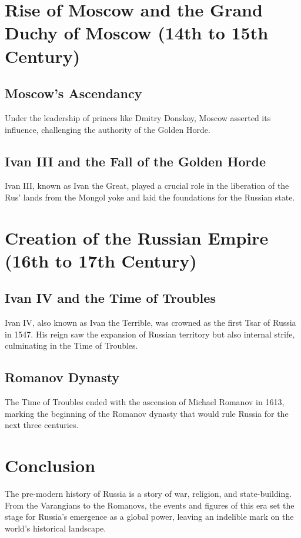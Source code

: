 \documentclass{book}
\begin{document}
\section{Rise of Moscow and the Grand Duchy of Moscow (14th to 15th Century)}
\label{sec:rise-of-moscow}
\subsection{Moscow’s Ascendancy}
Under the leadership of princes like Dmitry Donskoy, Moscow asserted its influence, challenging the authority of the Golden Horde.

\subsection{Ivan III and the Fall of the Golden Horde}
Ivan III, known as Ivan the Great, played a crucial role in the liberation of the Rus’ lands from the Mongol yoke and laid the foundations for the Russian state.

\section{Creation of the Russian Empire (16th to 17th Century)}
\label{sec:russian-empire}
\subsection{Ivan IV and the Time of Troubles}
Ivan IV, also known as Ivan the Terrible, was crowned as the first Tsar of Russia in 1547. His reign saw the expansion of Russian territory but also internal strife, culminating in the Time of Troubles.

\subsection{Romanov Dynasty}
The Time of Troubles ended with the ascension of Michael Romanov in 1613, marking the beginning of the Romanov dynasty that would rule Russia for the next three centuries.

\section{Conclusion}
\label{sec:conclusion-pre-modern-russia}
The pre-modern history of Russia is a story of war, religion, and state-building. From the Varangians to the Romanovs, the events and figures of this era set the stage for Russia's emergence as a global power, leaving an indelible mark on the world’s historical landscape.
\end{document}
